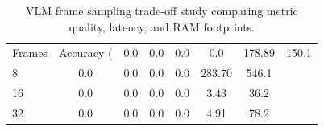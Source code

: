 \begin{table}[htbp]
  \centering
  \caption{VLM frame sampling trade-off study comparing metric quality, latency, and RAM footprints.}
  \label{tab:frame_sampling_study}
  \begin{tabular}{lcccccc}
    \toprule
    Frames & Accuracy (%
     & 0.0 & 0.0 & 0.0 & 0.0 & 178.89 & 150.1 \\
    8 & 0.0 & 0.0 & 0.0 & 0.0 & 283.70 & 546.1 \\
    16 & 0.0 & 0.0 & 0.0 & 0.0 & 3.43 & 36.2 \\
    32 & 0.0 & 0.0 & 0.0 & 0.0 & 4.91 & 78.2 \\
    \bottomrule
  \end{tabular}
\end{table}